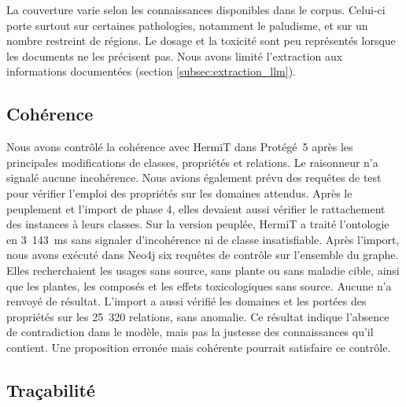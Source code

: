 La couverture varie selon les connaissances disponibles dans le corpus. Celui-ci porte surtout sur certaines pathologies, notamment le paludisme, et sur un nombre restreint de régions. Le dosage et la toxicité sont peu représentés lorsque les documents ne les précisent pas. Nous avons limité l'extraction aux informations documentées (section \ref{subsec:extraction_llm}).

\subsection{Cohérence}
\label{subsec:res_coherence}

Nous avons contrôlé la cohérence avec HermiT dans Protégé~5 après les principales modifications de classes, propriétés et relations. Le raisonneur n'a signalé aucune incohérence. Nous avions également prévu des requêtes de test pour vérifier l'emploi des propriétés sur les domaines attendus. Après le peuplement et l'import de phase 4, elles devaient aussi vérifier le rattachement des instances à leurs classes. Sur la version peuplée, HermiT a traité l'ontologie en 3~143~ms sans signaler d'incohérence ni de classe insatisfiable. Après l'import, nous avons exécuté dans Neo4j six requêtes de contrôle sur l'ensemble du graphe. Elles recherchaient les usages sans source, sans plante ou sans maladie cible, ainsi que les plantes, les composés et les effets toxicologiques sans source. Aucune n'a renvoyé de résultat. L'import a aussi vérifié les domaines et les portées des propriétés sur les 25~320 relations, sans anomalie. Ce résultat indique l'absence de contradiction dans le modèle, mais pas la justesse des connaissances qu'il contient. Une proposition erronée mais cohérente pourrait satisfaire ce contrôle.

\subsection{Traçabilité}
\label{subsec:res_tracabilite}

